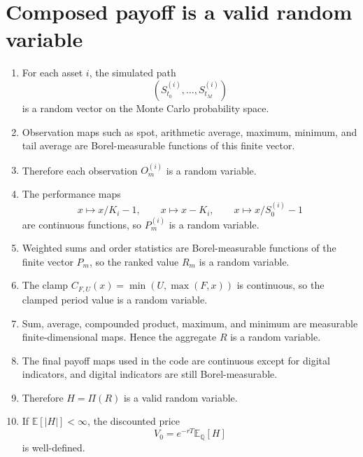 \documentclass[11pt,oneside]{book}
\theoremstyle{definition}
\newenvironment{proofsteps}
{\begin{enumerate}[label=\textbf{Line \arabic*.}, itemsep=0.35em]}
{\end{enumerate}}
\newcommand{\E}{\mathbb{E}}
\newcommand{\Q}{\mathbb{Q}}
\begin{document}
\section{Composed payoff is a valid random variable}
\begin{proofsteps}
\item For each asset \(i\), the simulated path
\[
  \left(S_{t_0}^{(i)},\ldots,S_{t_M}^{(i)}\right)
\]
is a random vector on the Monte Carlo probability space.
\item Observation maps such as spot, arithmetic average, maximum, minimum, and
tail average are Borel-measurable functions of this finite vector.
\item Therefore each observation \(O_m^{(i)}\) is a random variable.
\item The performance maps
\[
  x\mapsto x/K_i-1,\qquad x\mapsto x-K_i,\qquad x\mapsto x/S_0^{(i)}-1
\]
are continuous functions, so \(P_m^{(i)}\) is a random variable.
\item Weighted sums and order statistics are Borel-measurable functions of the
finite vector \(P_m\), so the ranked value \(R_m\) is a random variable.
\item The clamp \(C_{F,U}(x)=\min(U,\max(F,x))\) is continuous, so the clamped
period value is a random variable.
\item Sum, average, compounded product, maximum, and minimum are measurable
finite-dimensional maps. Hence the aggregate \(R\) is a random variable.
\item The final payoff maps used in the code are continuous except for digital
indicators, and digital indicators are still Borel-measurable.
\item Therefore \(H=\Pi(R)\) is a valid random variable.
\item If \(\E[|H|]<\infty\), the discounted price
\[
  V_0=e^{-rT}\E_{\Q}[H]
\]
is well-defined.
\end{proofsteps}
\end{document}
